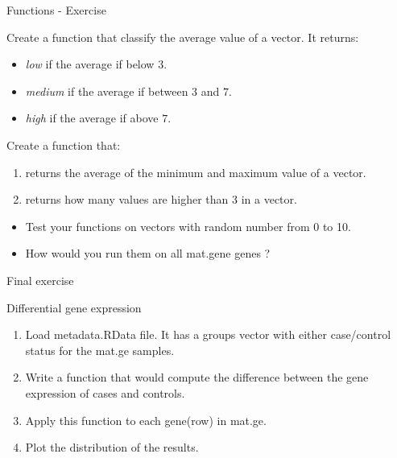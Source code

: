 \documentclass[10pt]{beamer}
\begin{document}
\begin{frame}{Functions - Exercise}
  \begin{block}{}
    Create a function that classify the average value of a {\sf vector}. It returns:
    \begin{itemize}
    \item {\it low} if the average if below $3$.
    \item {\it medium} if the average if between $3$ and $7$.
    \item {\it high} if the average if above $7$.
    \end{itemize}    
  \end{block}
  
  \begin{block}{}
    Create a function that: 
    \begin{enumerate}
    \item returns the average of the minimum and maximum value of a {\sf vector}.
    \item returns how many values are higher than 3 in a {\sf vector}.
    \end{enumerate}
  \end{block}

  \begin{block}{}
    \begin{itemize}
    \item Test your functions on {\sf vector}s with random number from 0 to 10.
    \item How would you run them on all {\sf mat.gene} genes ?
    \end{itemize}    
  \end{block}
  
\end{frame}


\begin{frame}{Final exercise}

  \begin{block}{Differential gene expression}
    \begin{enumerate}
    \item Load {\sf metadata.RData} file. It has a {\sf groups} vector with either case/control status for the {\sf mat.ge} samples.
    \item Write a function that would compute the difference between the gene expression of cases and controls.
    \item Apply this function to each gene(row) in {\sf mat.ge}.
    \item Plot the distribution of the results. 
    \end{enumerate}  
  \end{block}
  
\end{frame}
\end{document}
